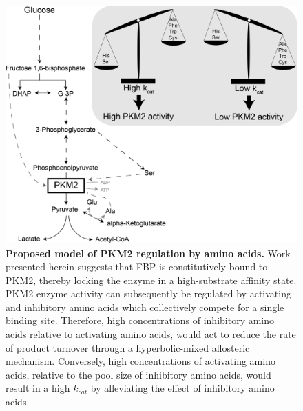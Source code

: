 \begin{figure}[!ht]
\includegraphics[scale=0.6]{pkm2_aa_scheme.png}
\caption[Proposed model of PKM2 regulation by amino acids.]{\textbf{Proposed model of PKM2 regulation by amino acids.} Work presented herein suggests that FBP is constitutively bound to PKM2, thereby locking the enzyme in a high-substrate affinity state. PKM2 enzyme activity can subsequently be regulated by activating and inhibitory amino acids which collectively compete for a single binding site. Therefore, high concentrations of inhibitory amino acids relative to activating amino acids, would act to reduce the rate of product turnover through a hyperbolic-mixed allosteric mechanism. Conversely, high concentrations of activating amino acids, relative to the pool size of inhibitory amino acids, would result in a high $k_{cat}$ by alleviating the effect of inhibitory amino acids.}
\label{fig:pkm2_aa_model}
\end{figure}
%
%
\clearpage

 
